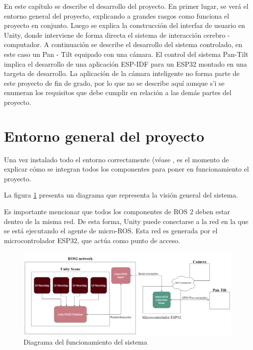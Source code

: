 En este cap\'itulo se describe el desarrollo del proyecto. En primer lugar, se verá el entorno general del proyecto, explicando a grandes rasgos como funciona el proyecto en conjunto. Luego se explica la construcci\'on del interfaz de usuario en Unity, donde interviene de forma directa el sistema de interacci\'on cerebro - computador. A continuaci\'on se describe el desarrollo del sistema controlado, en este caso un Pan - Tilt equipado con una c\'amara. El control del sistema Pan-Tilt implica el desarrollo de una aplicaci\'on ESP-IDF para un ESP32 montado en una targeta de desarrollo. La aplicaci\'on de la c\'amara inteligente no forma parte de este proyecto de fin de grado, por lo que no se describe aqu\'i aunque s'i se enumeran los requisitos que debe cumplir en relaci\'on a las dem\'as partes del proyecto.

\section{Entorno general del proyecto}
\label{section:generalenvironment}

Una vez instalado todo el entorno correctamente (véase , es el momento de explicar cómo se integran todos los componentes para poner en funcionamiento el proyecto.



La figura \ref{figure:diagram-ros2forunity} presenta un diagrama que representa la visión general del sistema.



Es importante mencionar que todos los componentes de ROS 2 deben estar dentro de la misma red. De esta forma, Unity puede conectarse a la red en la que se está ejecutando el agente de micro-ROS. Esta red es generada por el microcontrolador ESP32, que actúa como punto de acceso.



\begin{figure}[!htb]
\centering
\includegraphics[width=1\linewidth]{figures/Diagram-Ros2ForUnity.png}
\caption{Diagrama del funcionamiento del sistema}
\label{figure:diagram-ros2forunity}
\end{figure}



